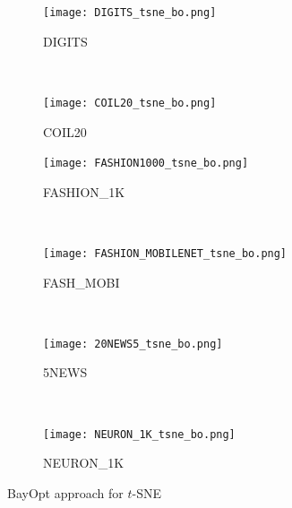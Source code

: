 \begin{figure}[ht!]
    \begin{subfigure}[b]{.46\linewidth}
        \centering
        \texttt{[image: DIGITS\_tsne\_bo.png]}
        \caption{DIGITS}
    \end{subfigure}
    ~
    \begin{subfigure}[b]{.46\linewidth}
        \centering
        \texttt{[image: COIL20\_tsne\_bo.png]}
        \caption{COIL20}
    \end{subfigure}
    \vfill
    \begin{subfigure}[b]{.46\linewidth}
        \centering
        \texttt{[image: FASHION1000\_tsne\_bo.png]}
        \caption{{FASHION\_1K}}
    \end{subfigure}
    ~
    \begin{subfigure}[b]{.46\linewidth}
        \centering
        \texttt{[image: FASHION\_MOBILENET\_tsne\_bo.png]}
        \caption{{FASH\_MOBI}}
    \end{subfigure}
    ~
    \vfill
    \begin{subfigure}[b]{.46\linewidth}
        \centering
        \texttt{[image: 20NEWS5\_tsne\_bo.png]}
        \caption{5NEWS}
    \end{subfigure}
    ~
    \begin{subfigure}[b]{.46\linewidth}
        \centering
        \texttt{[image: NEURON\_1K\_tsne\_bo.png]}
        \caption{{NEURON\_1K}}
    \end{subfigure}
    \caption{BayOpt approach for  $t$-SNE}
    \label{fig:tsne:bo:all}
\end{figure}

